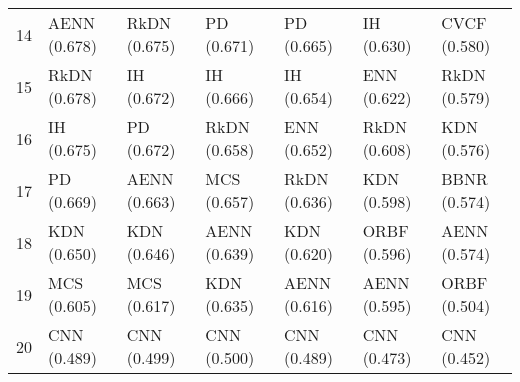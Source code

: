 \begin{tabular}{lllllll}
14   &      AENN (0.678) &      RkDN (0.675) &        PD (0.671) &        PD (0.665) &        IH (0.630) &      CVCF (0.580) \\
15   &      RkDN (0.678) &        IH (0.672) &        IH (0.666) &        IH (0.654) &       ENN (0.622) &      RkDN (0.579) \\
16   &        IH (0.675) &        PD (0.672) &      RkDN (0.658) &       ENN (0.652) &      RkDN (0.608) &       KDN (0.576) \\
17   &        PD (0.669) &      AENN (0.663) &       MCS (0.657) &      RkDN (0.636) &       KDN (0.598) &      BBNR (0.574) \\
18   &       KDN (0.650) &       KDN (0.646) &      AENN (0.639) &       KDN (0.620) &      ORBF (0.596) &      AENN (0.574) \\
19   &       MCS (0.605) &       MCS (0.617) &       KDN (0.635) &      AENN (0.616) &      AENN (0.595) &      ORBF (0.504) \\
20   &       CNN (0.489) &       CNN (0.499) &       CNN (0.500) &       CNN (0.489) &       CNN (0.473) &       CNN (0.452) \\
\bottomrule
\end{tabular}
